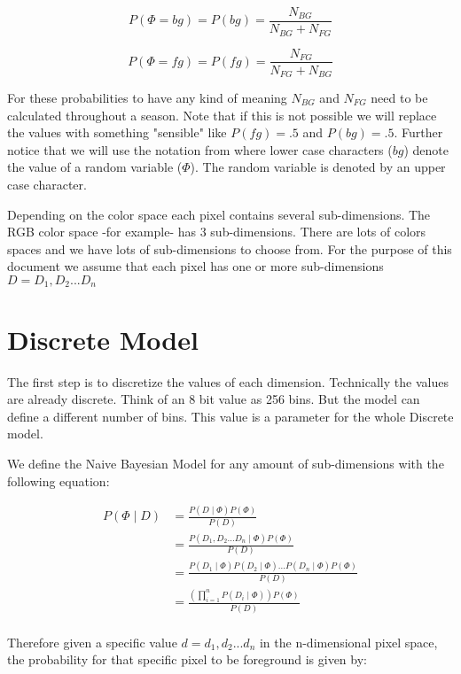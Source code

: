 \documentclass[a4paper,12pt]{report}
\begin{document}
\begin{equation}
P(\Phi= bg) = P(bg) = \frac{N_{BG}}{N_{BG}+N_{FG}}
\end{equation}

\begin{equation}
P(\Phi= fg) = P(fg) = \frac{N_{FG}}{N_{FG}+N_{BG}}
\end{equation}

For these probabilities to have any kind of meaning $N_{BG}$ and $N_{FG}$ need
to be calculated throughout a season. Note that if this is not possible we will
replace the values with something "sensible" like $P(fg)=.5$ and $P(bg)=.5$.
Further notice that we will use the notation from
 where
lower case characters ($bg$) denote the value of a random variable ($\Phi$).
The random variable is denoted by an upper case character.

Depending on the color space each pixel contains several sub-dimensions. The RGB
color space -for example- has 3 sub-dimensions. There are lots of colors spaces and we have
lots of sub-dimensions to choose from. For the purpose of this document we assume
that each pixel has one or more sub-dimensions $D={D_1, D_2... D_n}$

\section{Discrete Model}
The first step is to discretize the values of each dimension. Technically the
values are already discrete. Think of an 8 bit value as 256 bins. But the model
can define a different number of bins. This value is a parameter for the
whole Discrete model.

We define the Naive Bayesian Model for any amount of sub-dimensions with the
following equation:

\begin{align}
P(\Phi \mid D)
    &= \frac{P(D \mid \Phi) P(\Phi)}
            {P(D)} \\
    &= \frac{P(D_1, D_2...D_n \mid \Phi) P(\Phi)}
            {P(D)} \\
    &= \frac{P(D_1 \mid \Phi)
             P(D_2 \mid \Phi) ...
             P(D_n \mid \Phi) P(\Phi)}
            {P(D)} \\
    &= \frac{(\prod_{i=1}^n{P(D_i \mid \Phi)}) P(\Phi)}
            {P(D)} \\
\end{align}

Therefore given a specific value $d={d_1,d_2...d_n}$ in the n-dimensional
pixel space, the probability for that specific pixel to be foreground is
given by:
\end{document}
